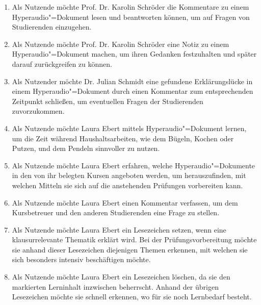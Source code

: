 \begin{enumerate}[leftmargin=1.3cm,label=US-\arabic*:,ref=US-\arabic*]
\item \label{US-Antwort-L} Als Nutzende möchte Prof. Dr. Karolin Schröder die Kommentare zu einem Hyperaudio"=Dokument lesen und beantworten können, um auf Fragen von Studierenden einzugehen.

\item \label{US-Notiz-L} Als Nutzende möchte Prof. Dr. Karolin Schröder eine Notiz zu einem Hyperaudio"=Dokument machen, um ihren Gedanken festzuhalten und später darauf zurückgreifen zu können.

\item \label{US-Kommentar-L} Als Nutzender möchte Dr. Julian Schmidt eine gefundene Erklärungslücke in einem Hyperaudio"=Dokument durch einen Kommentar zum entsprechenden Zeitpunkt schließen, um eventuellen Fragen der Studierenden zuvorzukommen.


\item \label{US-Zeit} Als Nutzende möchte Laura Ebert mittels Hyperaudio"=Dokument lernen, um die Zeit während Haushaltsarbeiten, wie dem Bügeln, Kochen oder Putzen, und dem Pendeln sinnvoller zu nutzen.

\item \label{US-Uebersicht-Kurse} Als Nutzende möchte Laura Ebert erfahren, welche Hyperaudio"=Dokumente in den von ihr belegten Kursen angeboten werden, um herauszufinden, mit welchen Mitteln sie sich auf die anstehenden Prüfungen vorbereiten kann.

\item \label{US-Kommentar-S} Als Nutzende möchte Laura Ebert einen Kommentar verfassen, um dem Kursbetreuer und den anderen Studierenden eine Frage zu stellen.

\item \label{US-Lesezeichen} Als Nutzende möchte Laura Ebert ein Lesezeichen setzen, wenn eine klausurrelevante Thematik erklärt wird. Bei der Prüfungsvorbereitung möchte sie anhand dieser Lesezeichen diejenigen Themen erkennen, mit welchen sie sich besonders intensiv beschäftigen möchte.

\item \label{US-Lesezeichen-Loeschen} Als Nutzende möchte Laura Ebert ein Lesezeichen löschen, da sie den markierten Lerninhalt inzwischen beherrscht. Anhand der übrigen Lesezeichen möchte sie schnell erkennen, wo für sie noch Lernbedarf besteht.


\end{enumerate}

